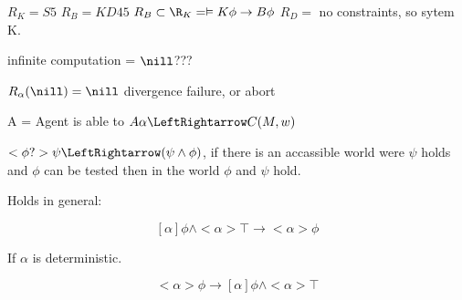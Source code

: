 \documentclass{article}
\begin{document}
$R_K = S5$
$R_B = KD45$
$R_B \subset \R_K = \vDash K\phi \to B\phi$
$R_D =$ no constraints, so sytem K.

infinite computation = $\nill$???

$R_\alpha(\nill)=\nill$ {divergence failure, or abort}

A = Agent is able to
$A\alpha \LeftRightarrow C(M,w)$

$<\phi?>\psi \LeftRightarrow (\psi \wedge \phi)$, if there is an accassible world
were $\psi$ holds and $\phi$ can be tested then in the world $\phi$ and $\psi$ hold.

Holds in general:

\[[\alpha]\phi \wedge <\alpha>\top\to <\alpha>\phi\]

If $\alpha$ is deterministic.

\[ <\alpha>\phi \to [\alpha]\phi \wedge <\alpha>\top\]
\end{document}
